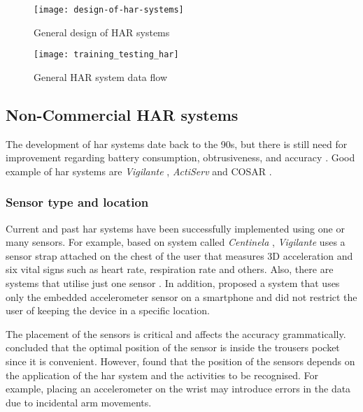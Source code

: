     \begin{figure}[ht]
        \centering
        \texttt{[image: design-of-har-systems]}
        \caption{General design of HAR systems}
        \label{fig:design-of-har}
    \end{figure}
    
    \begin{figure}[ht]
        \centering
        \texttt{[image: training\_testing\_har]}
        \caption{General HAR system data flow}
        \label{fig:har-data-flow}
    \end{figure}

    \subsection{Non-Commercial HAR systems}
    The development of \gls{har} systems date back to the 90s, but there is still need for improvement regarding battery consumption, obtrusiveness, and accuracy \citet[29]{labrador2013}. Good example of \gls{har} systems are \textit{Vigilante} \citep[38-39]{lara2012}, \textit{ActiServ} \citep{berchtold2010} and COSAR \citep[271-289]{riboni2010}.
    
        \subsubsection{Sensor type and location}
        Current and past \gls{har} systems have been successfully implemented using one or many sensors. For example, based on system called \textit{Centinela} \citep[38]{lara2012a}, \textit{Vigilante} uses a sensor strap attached on the chest of the user that measures 3D acceleration and six vital signs such as heart rate, respiration rate and others. Also, there are systems that utilise just one sensor \citep[1-3]{paul2015}. In addition, \citet[1-4]{torreshuitzil2015a} proposed a system that uses only the embedded accelerometer sensor on a smartphone and did not restrict the user of keeping the device in a specific location.
        
        The placement of the sensors is critical and affects the accuracy grammatically. \citet[2245–2250]{he2008} concluded that the optimal position of the sensor is inside the trousers pocket since it is convenient. However, \citet[1194]{lara2013} found that the position of the sensors depends on the application of the \gls{har} system and the activities to be recognised. For example, placing an accelerometer on the wrist may introduce errors in the data due to incidental arm movements.
        
